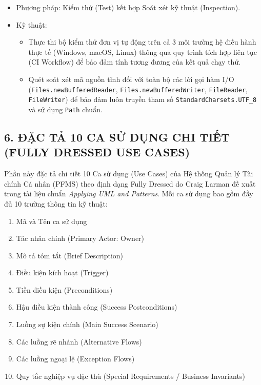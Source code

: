 \documentclass[11pt,a4paper]{article}
\providecommand{\tightlist}{
  \setlength{\itemsep}{0pt}\setlength{\parskip}{0pt}}
\begin{document}
\begin{itemize}
  \begin{itemize}
  \tightlist
  \item
    Phương pháp: Kiểm thử (Test) kết hợp Soát xét kỹ thuật (Inspection).
  \item
    Kỹ thuật:

    \begin{itemize}
    \tightlist
    \item
      Thực thi bộ kiểm thử đơn vị tự động trên cả 3 môi trường hệ điều
      hành thực tế (Windows, macOS, Linux) thông qua quy trình tích hợp
      liên tục (CI Workflow) để bảo đảm tính tương đương của kết quả
      chạy thử.
    \item
      Quét soát xét mã nguồn tĩnh đối với toàn bộ các lời gọi hàm I/O
      (\texttt{Files.newBufferedReader},
      \texttt{Files.newBufferedWriter}, \texttt{FileReader},
      \texttt{FileWriter}) để bảo đảm luôn truyền tham số
      \texttt{StandardCharsets.UTF\_8} và sử dụng \texttt{Path} chuẩn.
    \end{itemize}
  \end{itemize}
\end{itemize}

\clearpage
\subsection{6. ĐẶC TẢ 10 CA SỬ DỤNG CHI TIẾT (FULLY DRESSED USE
CASES)}\label{6-ux111ux1eb7c-tux1ea3-10-ca-sux1eed-dux1ee5ng-chi-tiux1ebft-fully-dressed-use-cases}

Phần này đặc tả chi tiết 10 Ca sử dụng (Use Cases) của Hệ thống Quản lý
Tài chính Cá nhân (PFMS) theo định dạng Fully Dressed do Craig Larman đề
xuất trong tài liệu chuẩn \emph{Applying UML and Patterns}. Mỗi ca sử
dụng bao gồm đầy đủ 10 trường thông tin kỹ thuật:

\begin{enumerate}
\def\labelenumi{\arabic{enumi}.}
\tightlist
\item
  Mã và Tên ca sử dụng
\item
  Tác nhân chính (Primary Actor: Owner)
\item
  Mô tả tóm tắt (Brief Description)
\item
  Điều kiện kích hoạt (Trigger)
\item
  Tiền điều kiện (Preconditions)
\item
  Hậu điều kiện thành công (Success Postconditions)
\item
  Luồng sự kiện chính (Main Success Scenario)
\item
  Các luồng rẽ nhánh (Alternative Flows)
\item
  Các luồng ngoại lệ (Exception Flows)
\item
  Quy tắc nghiệp vụ đặc thù (Special Requirements / Business Invariants)
\end{enumerate}
\end{document}
